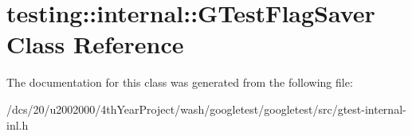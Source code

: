 \hypertarget{classtesting_1_1internal_1_1GTestFlagSaver}{}\section{testing\+:\+:internal\+:\+:G\+Test\+Flag\+Saver Class Reference}
\label{classtesting_1_1internal_1_1GTestFlagSaver}


The documentation for this class was generated from the following file\+:\begin{DoxyCompactItemize}
\item 
/dcs/20/u2002000/4th\+Year\+Project/wash/googletest/googletest/src/gtest-\/internal-\/inl.\+h\end{DoxyCompactItemize}

